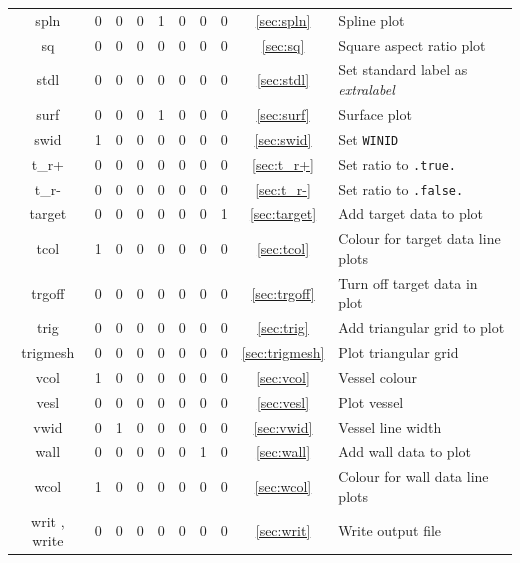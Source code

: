 \documentclass[a4paper,10pt]{report}
\begin{document}
\begin{center}
\begin{longtable}{|c|c|c|c|c|c|c|c|c|l|}
    spln \index{b2plot, spln}      & 0 & 0 & 0 & 1 & 0 & 0 & 0 & \ref{sec:spln}   & Spline plot \\
    sq \index{b2plot, sq}          & 0 & 0 & 0 & 0 & 0 & 0 & 0 & \ref{sec:sq}     & Square aspect ratio plot \\
    stdl \index{b2plot, stdl}      & 0 & 0 & 0 & 0 & 0 & 0 & 0 & \ref{sec:stdl}   & Set standard label as {\em extralabel} \\
    surf \index{b2plot, surf}      & 0 & 0 & 0 & 1 & 0 & 0 & 0 & \ref{sec:surf}   & Surface plot \\
    swid \index{b2plot, swid}      & 1 & 0 & 0 & 0 & 0 & 0 & 0 & \ref{sec:swid}   & Set {\tt WINID} \\
    t\_r+ \index{b2plot, t\_r+}    & 0 & 0 & 0 & 0 & 0 & 0 & 0 & \ref{sec:t_r+}   & Set ratio to {\tt .true.} \\
    t\_r- \index{b2plot, t\_r-}    & 0 & 0 & 0 & 0 & 0 & 0 & 0 & \ref{sec:t_r-}   & Set ratio to {\tt .false.} \\
    target \index{b2plot, target}  & 0 & 0 & 0 & 0 & 0 & 0 & 1 & \ref{sec:target} & Add target data to plot \\
    tcol \index{b2plot, tcol}      & 1 & 0 & 0 & 0 & 0 & 0 & 0 & \ref{sec:tcol}   & Colour for target data line plots \\
    trgoff \index{b2plot, trgoff}  & 0 & 0 & 0 & 0 & 0 & 0 & 0 & \ref{sec:trgoff} & Turn off target data in plot \\
    trig \index{b2plot, trig}      & 0 & 0 & 0 & 0 & 0 & 0 & 0 & \ref{sec:trig}   & Add triangular grid to plot \\
    trigmesh \index{b2plot, trigmesh}  & 0 & 0 & 0 & 0 & 0 & 0 & 0 & \ref{sec:trigmesh} & Plot triangular grid \\
    vcol \index{b2plot, vcol}      & 1 & 0 & 0 & 0 & 0 & 0 & 0 & \ref{sec:vcol}   & Vessel colour \\
    vesl \index{b2plot, vesl}      & 0 & 0 & 0 & 0 & 0 & 0 & 0 & \ref{sec:vesl}   & Plot vessel \\
    vwid \index{b2plot, vwid}      & 0 & 1 & 0 & 0 & 0 & 0 & 0 & \ref{sec:vwid}   & Vessel line width \\
    wall \index{b2plot, wall}      & 0 & 0 & 0 & 0 & 0 & 1 & 0 & \ref{sec:wall}   & Add wall data to plot \\
    wcol \index{b2plot, wcol}      & 1 & 0 & 0 & 0 & 0 & 0 & 0 & \ref{sec:wcol}   & Colour for wall data line plots \\
    writ \index{b2plot, writ}, write \index{b2plot, write} & 0 & 0 & 0 & 0 & 0 & 0 & 0 & \ref{sec:writ}   & Write output file \\

\end{longtable}
\end{center}
\end{document}
